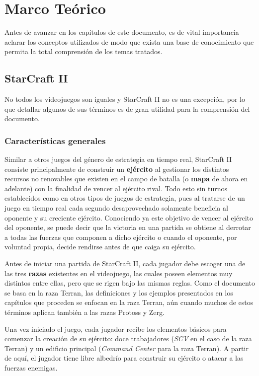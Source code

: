 \chapter{Marco Teórico}

Antes de avanzar en los capítulos de este documento, es de vital importancia aclarar los conceptos utilizados de modo que exista una base de conocimiento que permita la total comprensión de los temas tratados.

\section{StarCraft II}

No todos los videojuegos son iguales y StarCraft II no es una excepción, por lo que detallar algunos de sus términos es de gran utilidad para la comprensión del documento.

\subsection{Características generales}

Similar a otros juegos del género de estrategia en tiempo real, StarCraft II consiste principalmente de construir un \textbf{ejército} al gestionar los distintos recursos no renovables que existen en el campo de batalla (o \textbf{mapa} de ahora en adelante) con la finalidad de vencer al ejército rival. Todo esto sin turnos establecidos como en otros tipos de juegos de estrategia, pues al tratarse de un juego en tiempo real cada segundo desaprovechado solamente beneficia al oponente y su creciente ejército. Conociendo ya este objetivo de vencer al ejército del oponente, se puede decir que la victoria en una partida se obtiene al derrotar a todas las fuerzas que componen a dicho ejército o cuando el oponente, por voluntad propia, decide rendirse antes de que caiga su ejército.

Antes de iniciar una partida de StarCraft II, cada jugador debe escoger una de las tres \textbf{razas} existentes en el videojuego, las cuales poseen elementos muy distintos entre ellas, pero que se rigen bajo las mismas reglas. Como el documento se basa en la raza Terran, las definiciones y los ejemplos presentados en los capítulos que proceden se enfocan en la raza Terran, aún cuando muchos de estos términos aplican también a las razas Protoss y Zerg.

Una vez iniciado el juego, cada jugador recibe los elementos básicos para comenzar la creación de su ejército: doce trabajadores (\textit{SCV} en el caso de la raza Terran) y un edificio principal (\textit{Command Center} para la raza Terran). A partir de aquí, el jugador tiene libre albedrío para construir su ejército o atacar a las fuerzas enemigas.

